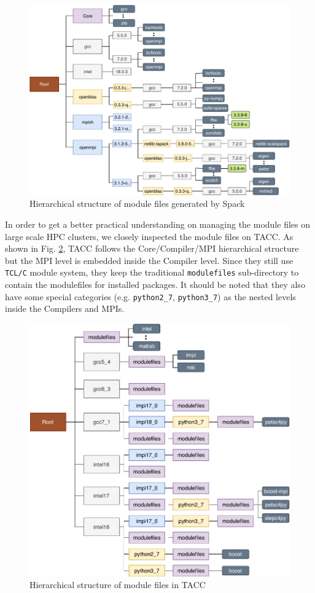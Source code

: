 \documentclass[conference]{IEEEtran}
\begin{document}
\begin{figure}[htbp]
  \centerline{\includegraphics[width=\linewidth]{figures/spack_hier}}
  \caption{Hierarchical structure of module files generated by Spack}
  \label{fig:spack_hier}
\end{figure}


In order to get a better practical understanding on managing the module files on large scale HPC clusters, we closely inspected the module files on TACC. As shown in Fig. \ref{fig:tacc_hier}, TACC follows the Core/Compiler/MPI hierarchical structure but the MPI level is embedded inside the Compiler level. Since they still use \texttt{TCL/C} module system, they keep the traditional \texttt{modulefiles} sub-directory to contain the modulefiles for installed packages. It should be noted that they also have some special categories (e.g. \texttt{python2\_7}, \texttt{python3\_7}) as the nested levels inside the Compilers and MPIs.

\begin{figure}[htbp]
  \centerline{\includegraphics[width=\linewidth]{figures/tacc_hier}}
  \caption{Hierarchical structure of module files in TACC}
  \label{fig:tacc_hier}
\end{figure}
\end{document}
